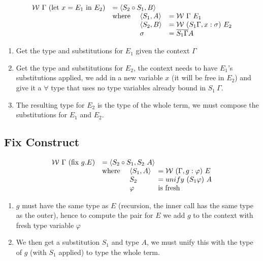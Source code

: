 \[\begin{matrix*}[l]
    \mathcal{W} \ \Gamma \ (\mllet{x = E_1}{E_2}) & = \langle S_2 \circ S_1, B \rangle \\
    & \begin{matrix*}[l]
        \text{where } & \langle S_1, A \rangle & = \mathcal{W} \ \Gamma \ E_1 \\
        & \langle S_2, B \rangle & = \mathcal{W} \ (S_1 \Gamma, x:\sigma) \ E_2 \\
        & \sigma & = \overline{S_1\Gamma} A \\
    \end{matrix*} \\
\end{matrix*}\]
\begin{enumerate}
    \item Get the type and substitutions for $E_1$ given the context $\Gamma$
    \item Get the type and substitutions for $E_2$, the context needs to have $E_1$'s substitutions applied, we add in a new variable $x$ (it will be free in $E_2$) and give it a $\forall$ type that uses no type variables already bound in $S_1 \ \Gamma$.
    \item The resulting type for $E_2$ is the type of the whole term, we must compose the substitutions for $E_1$ and $E_2$.
\end{enumerate}

\subsection{Fix Construct}

\[\begin{matrix*}[l]
    \mathcal{W} \ \Gamma \ (\mlfix{g}{E}) & = \langle S_2 \circ S_1, S_2 \ A \rangle \\
    & \begin{matrix*}[l]
        \text{where } & \langle S_1, A \rangle &= \mathcal{W} \ (\Gamma, g:\varphi) \ E \\
        & S_2 & = unify \ (S_1 \varphi) \ A \\
        & \varphi & \text{is fresh} \\
    \end{matrix*} \\
\end{matrix*}\]
\begin{enumerate}
    \item $g$ must have the same type as $E$ (recursion, the inner call has the same type as the outer), hence to compute the pair for $E$ we add $g$ to the context with fresh type variable $\varphi$
    \item We then get a substitution $S_1$ and type $A$, we must unify this with the type of $g$ (with $S_1$ applied) to type the whole term.
\end{enumerate}

